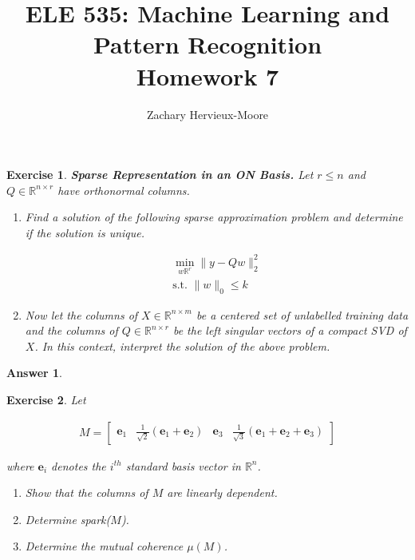 \documentclass[12pt]{article}
\title{ELE 535: Machine Learning and Pattern Recognition \\ Homework 7}
\author{Zachary Hervieux-Moore}
\date{\displaydate{date}}
\theoremstyle{colon}
\newtheorem{exercise}{Exercise}
\newtheorem*{answer}{Answer}
\begin{document}
\maketitle

\clearpage

\begin{exercise}
  \textbf{Sparse Representation in an ON Basis.} Let $r \leq n$ and $Q \in \mathbb{R}^{n \times r}$ have orthonormal columns.

  \begin{enumerate}[label=\alph*)]
    \item Find a solution of the following sparse approximation problem and determine if the solution is unique.

      \begin{gather*}
        \min_{w \mathbb{R}^r} \lVert y - Qw \rVert_2^2 \\
        \text{s.t. } \lVert w \rVert_0 \leq k
      \end{gather*}

    \item Now let the columns of $X \in \mathbb{R}^{n \times m}$ be a centered set of unlabelled training data and the columns of $Q \in \mathbb{R}^{n \times r}$ be the left singular vectors of a compact SVD of $X$. In this context, interpret the solution of the above problem.
  \end{enumerate}
\end{exercise}

\begin{answer}

\end{answer}

\clearpage

\begin{exercise}
  Let

  \begin{gather*}
    M = \begin{bmatrix} \bm{e}_1 & \frac{1}{\sqrt{2}} (\bm{e}_1 + \bm{e}_2) & \bm{e}_3 & \frac{1}{\sqrt{3}} (\bm{e}_1 + \bm{e}_2 + \bm{e}_3)\end{bmatrix}
  \end{gather*}

  where $\bm{e}_i$ denotes the $i^{th}$ standard basis vector in $\mathbb{R}^n$.

  \begin{enumerate}[label=\alph*)]
    \item Show that the columns of $M$ are linearly dependent.
    \item Determine spark($M$).
    \item Determine the mutual coherence $\mu(M)$.
  \end{enumerate}
\end{exercise}
\end{document}
